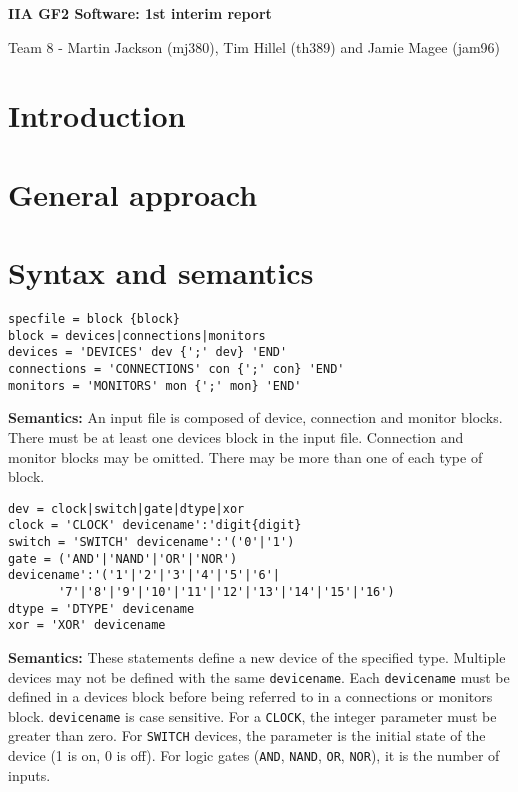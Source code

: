 \documentclass[a4paper,10pt]{article}
\begin{document}
\begin{center}
\LARGE \textbf{IIA GF2 Software: 1st interim report}

\small Team 8 - Martin Jackson (mj380), Tim Hillel (th389) and Jamie Magee (jam96)
\end{center}



\section{Introduction}


\section{General approach}



\section{Syntax and semantics}

\begin{verbatim}
specfile = block {block}
block = devices|connections|monitors
devices = 'DEVICES' dev {';' dev} 'END'
connections = 'CONNECTIONS' con {';' con} 'END' 
monitors = 'MONITORS' mon {';' mon} 'END'
\end{verbatim} 

\textbf{Semantics:} An input file is composed of device, connection and monitor blocks. There must be at least one devices block in the input file. Connection and monitor blocks may be omitted. There may be more than one of each type of block. 

\begin{verbatim}
dev = clock|switch|gate|dtype|xor
clock = 'CLOCK' devicename':'digit{digit}
switch = 'SWITCH' devicename':'('0'|'1')
gate = ('AND'|'NAND'|'OR'|'NOR') devicename':'('1'|'2'|'3'|'4'|'5'|'6'|
       '7'|'8'|'9'|'10'|'11'|'12'|'13'|'14'|'15'|'16')
dtype = 'DTYPE' devicename
xor = 'XOR' devicename
\end{verbatim} 

\textbf{Semantics:} These statements define a new device of the specified type. Multiple devices may not be defined with the same \texttt{devicename}. Each \texttt{devicename} must be defined in a devices block before being referred to in a connections or monitors block. \texttt{devicename} is case sensitive. For a \texttt{CLOCK}, the integer parameter must be greater than zero. For \texttt{SWITCH} devices, the parameter is the initial state of the device (1 is on, 0 is off). For logic gates (\texttt{AND}, \texttt{NAND}, \texttt{OR}, \texttt{NOR}), it is the number of inputs.
\end{document}
